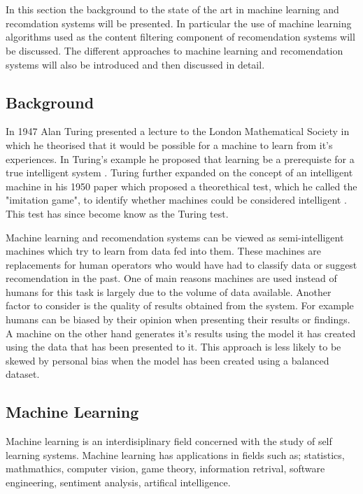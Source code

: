 \chapter{}

In this section the background to the state of the art in machine learning and recomdation systems will be presented.
In particular the use of machine learning algorithms used as the content filtering component of recomendation systems will be discussed.
The different approaches to machine learning and recomendation systems will also be introduced and then discussed in detail.

\section{Background}
In 1947 Alan Turing presented a lecture to the London Mathematical Society in which he theorised that it would be possible for a machine to learn from it's experiences.
In Turing's example he proposed that learning be a prerequiste for a true intelligent system \cite{Turing1946}.
Turing further expanded on the concept of an intelligent machine in his 1950 paper which proposed a theorethical test, which he called the "imitation game", to identify whether machines could be considered intelligent \cite{Turing1950}.
This test has since become know as the Turing test.

Machine learning and recomendation systems can be viewed as semi-intelligent machines which try to learn from data fed into them.
These machines are replacements for human operators who would have had to classify data or suggest recomendation in the past.
One of main reasons machines are used instead of humans for this task is largely due to the volume of data available.
Another factor to consider is the quality of results obtained from the system.
For example humans can be biased by their opinion when presenting their results or findings.
A machine on the other hand generates it's results using the model it has created using the data that has been presented to it.
This approach is less likely to be skewed by personal bias when the model has been created using a balanced dataset\cite{FProvost2000}.

\section{Machine Learning}
Machine learning is an interdisiplinary field concerned with the study of self learning systems.
Machine learning has applications in fields such as; statistics, mathmathics, computer vision, game theory, information retrival, software engineering, sentiment analysis, artifical intelligence.

